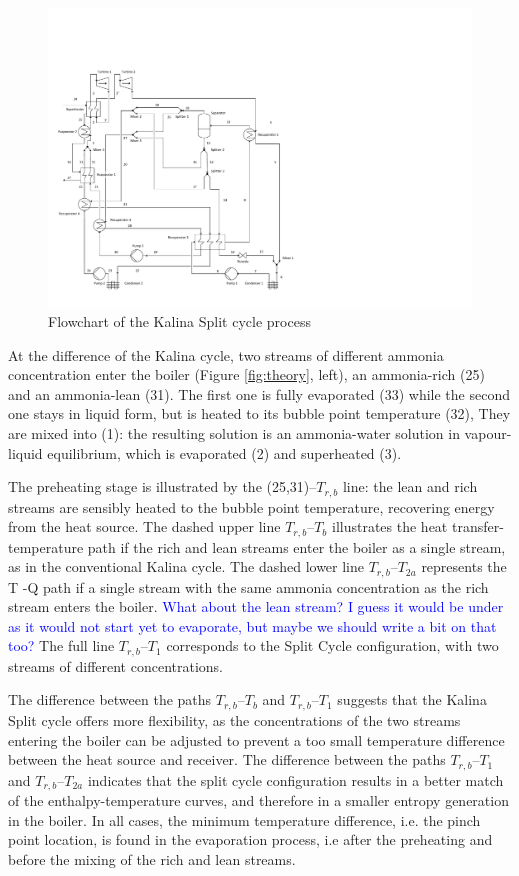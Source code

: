 \documentclass[final,times,3p]{elsarticle}
\begin{document}
\begin{figure}[htbp]
\centering
\includegraphics[scale=0.65]{Drawing_Kalina_Split.pdf}
\caption{Flowchart of the Kalina Split cycle process}
\label{fig:split_cycle}
\end{figure}

At the difference of the Kalina cycle, two streams of different ammonia concentration enter the boiler (Figure \ref{fig:theory}, left), an ammonia-rich (25) and an ammonia-lean (31). The first one is fully evaporated (33) while the second one stays in liquid form, but is heated to its bubble point temperature (32), They are mixed into (1): the resulting solution is an ammonia-water solution in vapour-liquid equilibrium, which is evaporated (2) and superheated (3). 

The preheating stage is illustrated by the (25,31)--$T_{r,b}$ line: the lean and rich streams are sensibly heated to the bubble point temperature, recovering energy from the heat source. The dashed upper line $T_{r,b}$--$T_b$ illustrates the heat transfer-temperature path if the rich and lean streams enter the boiler as a single stream, as in the conventional Kalina cycle. The dashed lower line $T_{r,b}$--$T_{2a}$ represents the T -Q path if a single stream with the same ammonia concentration as the rich stream enters the boiler. \textcolor{blue}{What about the lean stream? I guess it would be under as it would not start yet to evaporate, but maybe we should write a bit on that too?} The full line $T_{r,b}$--$T_{1}$ corresponds to the Split Cycle configuration, with two streams of different concentrations. 

The difference between the paths $T_{r,b}$--$T_b$ and $T_{r,b}$--$T_{1}$ suggests that the Kalina Split cycle offers more flexibility, as the concentrations of the two streams entering the boiler can be adjusted to prevent a too small temperature difference between the heat source and receiver. The difference between the paths $T_{r,b}$--$T_{1}$ and $T_{r,b}$--$T_{2a}$ indicates that the split cycle configuration results in a better match of the enthalpy-temperature curves, and therefore in a smaller entropy generation in the boiler. In all cases, the minimum temperature difference, i.e. the pinch point location, is found in the evaporation process, i.e after the preheating and before the mixing of the rich and lean streams. 
\end{document}
